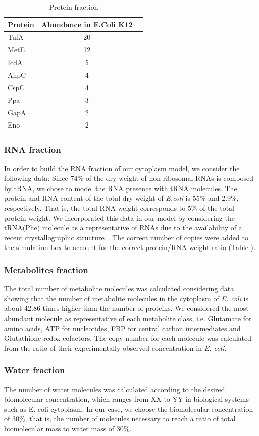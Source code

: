 \documentclass[journal=jacsat,manuscript=article]{achemso}
\begin{document}
\begin{table}
\centering
\begin{tabular}{lcc}
\hline
Protein & Abundance in E.Coli K12 \\ 
\hline
TufA	 & 20 \\
MetE	 & 12 \\
IcdA	 & 5 \\
AhpC	 & 4 \\
CspC	 & 4 \\
Ppa & 3 \\
GapA	 & 2 \\
Eno & 2 \\
\hline
\end{tabular}
\caption{Protein fraction}
\label{tbl:protein_fraction}
\end{table}


\subsubsection{RNA fraction}
In order to build the RNA fraction of our cytoplasm model, we consider the following data:
Since 74\% of the dry weight of non-ribosomal RNAs is composed by tRNA, we chose to model the RNA presence with tRNA molecules.
The protein and RNA content of the total dry weight of \textit{E.coli} is 55\% and 2.9\%, respectively. That is, the total RNA weight corresponds to 5\% of the total protein weight. We incorporated this data in our model by considering the tRNA(Phe) molecule as a representative of RNAs due to the availability of a recent crystallographic structure~\cite{Byrne2015}. The correct number of copies were added to the simulation box to account for the correct protein/RNA weight ratio (Table ).

\subsubsection{Metabolites fraction}
The total number of metabolite molecules was calculated considering data showing that the number of metabolite molecules in the cytoplasm of \textit{E. coli} is about 42.86 times higher than the number of proteins. We considered the most abundant molecule as representative of each metabolite class, i.e. Glutamate for amino acids, ATP for nucleotides, FBP for central carbon intermediates and Glutathione redox cofactors. The copy number for each molecule was calculated from the ratio of their experimentally observed concentration in {\em E. coli}.

\subsubsection{Water fraction}
The number of water molecules was calculated according to the desired biomolecular concentration, which ranges from XX to YY in biological systems such as E. coli cytoplasm. In our case, we choose the biomolecular concentration of 30\%, that is, the number of molecules necessary to reach a ratio of total biomolecular mass to water mass of 30\%.
\end{document}
